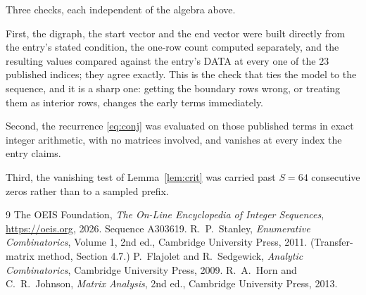 \documentclass[11pt,a4paper]{article}
\theoremstyle{plain}
\theoremstyle{definition}
\begin{document}
Three checks, each independent of the algebra above.

First, the digraph, the start vector and the end vector were built directly from the
entry's stated condition, the one-row count computed separately, and the resulting values
compared against the entry's DATA at every one of the $23$ published indices; they
agree exactly. This is the check that ties the model to the sequence, and it is a sharp one:
getting the boundary rows wrong, or treating them as interior rows, changes the early terms
immediately.

Second, the recurrence \eqref{eq:conj} was evaluated on those published terms in exact
integer arithmetic, with no matrices involved, and vanishes at every index the entry claims.

Third, the vanishing test of Lemma~\ref{lem:crit} was carried past $S=64$ consecutive
zeros rather than to a sampled prefix.

\begin{thebibliography}{9}
 The OEIS Foundation, \emph{The On-Line Encyclopedia of Integer
Sequences}, \url{https://oeis.org}, 2026. Sequence A303619.
 R.~P.~Stanley, \emph{Enumerative Combinatorics}, Volume 1, 2nd ed.,
Cambridge University Press, 2011. (Transfer-matrix method, Section 4.7.)
 P.~Flajolet and R.~Sedgewick, \emph{Analytic Combinatorics}, Cambridge
University Press, 2009.
 R.~A.~Horn and C.~R.~Johnson, \emph{Matrix Analysis}, 2nd ed., Cambridge
University Press, 2013.
\end{thebibliography}
\end{document}
